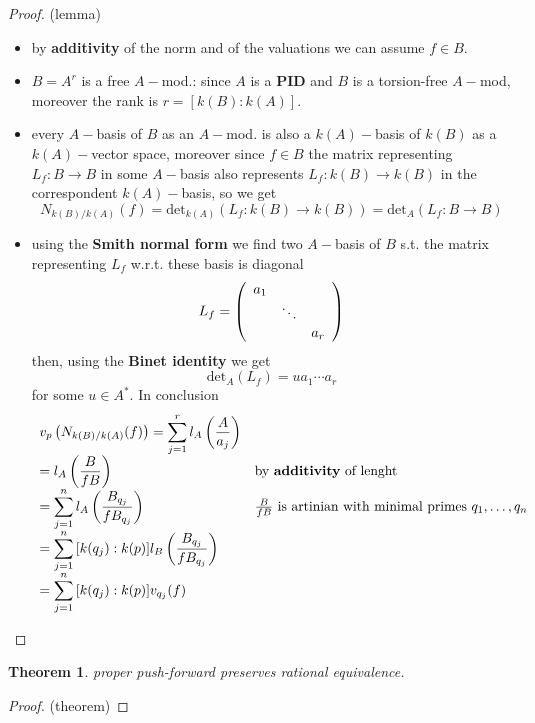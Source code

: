 \documentclass[oneside,a4paper,11pt]{amsbook}
\theoremstyle{pl}
\newtheorem{teo}{Theorem}[chapter]
\theoremstyle{df}
\theoremstyle{rm}
\newcommand{\pa}[1]{
\left(#1\right)
}
\begin{document}
\begin{proof}(lemma)
\begin{itemize}
\item{by \textbf{additivity} of the norm and of the valuations we can assume $f\in B$.}
\item{$B=A^r$ is a free $A-$mod.: since $A$ is a \textbf{PID} and $B$ is a torsion-free $A-$mod, moreover the rank is $r=[k(B):k(A)]$.}
\item{ every $A-$basis of $B$ as an $A-$mod. is also a $k(A)-$basis of $k(B)$ as a $k(A)-$vector space, moreover since $f\in B$ the matrix representing $L_f:B\rightarrow B$ in some $A-$basis also represents $L_f:k(B)\rightarrow k(B)$ in the correspondent $k(A)-$basis, so we get
\[
N_{k(B)/k(A)}(f)=\text{det}_{k(A)}(L_f:k(B)\rightarrow k(B))=\text{det}_A(L_f: B\rightarrow B)
\]
}
\item{using the \textbf{Smith normal form} we find two $A-$basis of $B$ s.t. the matrix representing $L_f$ w.r.t. these basis is diagonal
\[
L_f=\left(
\begin{array}{l l l}
a_1 & &\\
 &\ddots &\\
 & &a_r\\
\end{array}
\right)
\]
then, using the \textbf{Binet identity} we get
\[
\text{det}_A(L_f)=ua_1\cdots a_r
\]
for some $u\in A^*$. In conclusion
\[
\begin{array}{l l}
\displaystyle v_p\pa{N_{k(B)/k(A)}(f)}=\sum_{j=1}^r{l_A\pa{\frac{A}{a_j}}} &\\
\displaystyle =l_A\pa{\frac{B}{fB}} &\text{by \textbf{additivity} of lenght}\\
\displaystyle =\sum_{j=1}^n{l_A\pa{\frac{B_{q_j}}{fB_{q_j}}}} &\frac{B}{fB}\text{ is artinian with minimal primes }q_1,\dots,q_n\\
\displaystyle =\sum_{j=1}^n{[k(q_j):k(p)]l_B\pa{\frac{B_{q_j}}{fB_{q_j}}}} &\\
\displaystyle =\sum_{j=1}^n{[k(q_j):k(p)]v_{q_j}(f)} &\\
\end{array}
\]
}
\end{itemize}
\end{proof}

\begin{teo}
proper push-forward preserves rational equivalence.
\end{teo}

\begin{proof}(theorem)

\end{proof}
\end{document}
